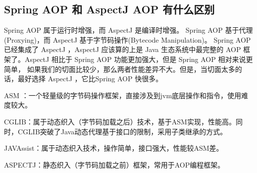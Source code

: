 \documentclass[../../../interview-questions.tex]{subfiles}
\begin{document}
\subsection{Spring AOP 和 AspectJ AOP 有什么区别}

Spring AOP 属于运行时增强，而 AspectJ 是编译时增强。 Spring AOP 基于代理(Proxying)，而 AspectJ 基于字节码操作(Bytecode Manipulation)。
Spring AOP 已经集成了 AspectJ  ，AspectJ  应该算的上是 Java 生态系统中最完整的 AOP 框架了。AspectJ  相比于 Spring AOP 功能更加强大，但是 Spring AOP 相对来说更简单，
如果我们的切面比较少，那么两者性能差异不大。但是，当切面太多的话，最好选择 AspectJ ，它比Spring AOP 快很多。


ASM ：一个轻量级的字节码操作框架，直接涉及到jvm底层操作和指令，使用难度较大。

CGLIB：属于动态织入（字节码加载之后）技术，基于ASM实现，性能高。同时，CGLIB突破了Java动态代理基于接口的限制，采用子类继承的方式。

JAVAssist：属于动态织入技术，操作简单，接口强大，性能较ASM差。

ASPECTJ：静态织入（字节码加载之前）框架，常用于AOP编程框架。
\end{document}
